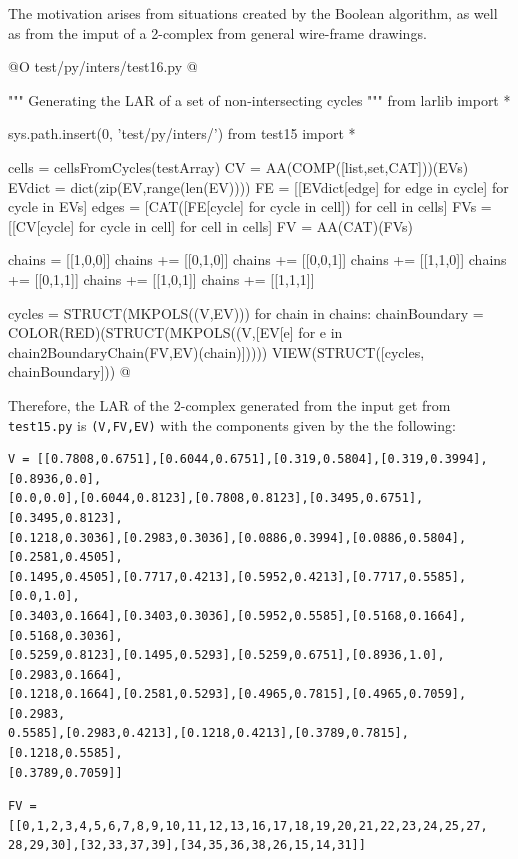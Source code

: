 \documentclass[11pt,oneside]{article}    %
\begin{document}
The motivation arises from situations created by the Boolean algorithm, as well as from the imput of a 2-complex from general wire-frame drawings.

@O test/py/inters/test16.py
@{""" Generating the LAR of a set of non-intersecting cycles """
from larlib import *

sys.path.insert(0, 'test/py/inters/')
from test15 import *

cells = cellsFromCycles(testArray)
CV = AA(COMP([list,set,CAT]))(EVs)
EVdict = dict(zip(EV,range(len(EV))))
FE = [[EVdict[edge] for edge in cycle] for cycle in EVs] 
edges = [CAT([FE[cycle] for cycle in cell]) for cell in cells]
FVs = [[CV[cycle] for cycle in cell] for cell in cells]
FV = AA(CAT)(FVs)

chains = [[1,0,0]]
chains += [[0,1,0]]
chains += [[0,0,1]]
chains += [[1,1,0]]
chains += [[0,1,1]]
chains += [[1,0,1]]
chains += [[1,1,1]]

cycles = STRUCT(MKPOLS((V,EV)))
for chain in chains:
    chainBoundary = COLOR(RED)(STRUCT(MKPOLS((V,[EV[e] 
                        for e in chain2BoundaryChain(FV,EV)(chain)]))))
    VIEW(STRUCT([cycles, chainBoundary]))
@}

Therefore, the LAR of the 2-complex generated from the input get from \texttt{test15.py}
is \texttt{(V,FV,EV)} with the components given by the the following:

\begin{verbatim}
V = [[0.7808,0.6751],[0.6044,0.6751],[0.319,0.5804],[0.319,0.3994],[0.8936,0.0],
[0.0,0.0],[0.6044,0.8123],[0.7808,0.8123],[0.3495,0.6751],[0.3495,0.8123],
[0.1218,0.3036],[0.2983,0.3036],[0.0886,0.3994],[0.0886,0.5804],[0.2581,0.4505],
[0.1495,0.4505],[0.7717,0.4213],[0.5952,0.4213],[0.7717,0.5585],[0.0,1.0],
[0.3403,0.1664],[0.3403,0.3036],[0.5952,0.5585],[0.5168,0.1664],[0.5168,0.3036],
[0.5259,0.8123],[0.1495,0.5293],[0.5259,0.6751],[0.8936,1.0],[0.2983,0.1664],
[0.1218,0.1664],[0.2581,0.5293],[0.4965,0.7815],[0.4965,0.7059],[0.2983,
0.5585],[0.2983,0.4213],[0.1218,0.4213],[0.3789,0.7815],[0.1218,0.5585],
[0.3789,0.7059]]
\end{verbatim}

\begin{verbatim}
FV = [[0,1,2,3,4,5,6,7,8,9,10,11,12,13,16,17,18,19,20,21,22,23,24,25,27,
28,29,30],[32,33,37,39],[34,35,36,38,26,15,14,31]]
\end{verbatim}
\end{document}
